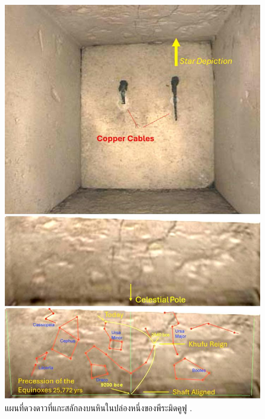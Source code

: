 \documentclass[10pt,twocolumn,letterpaper]{article}
\begin{document}
\begin{figure}[H]
\begin{center}
   \includegraphics[width=1\linewidth]{star-stone.jpg}
\end{center}
   \caption{แผนที่ดวงดาวที่แกะสลักลงบนหินในปล่องหนึ่งของพีระมิดคูฟู \cite{28}.}
\label{fig:20}
\label{fig:onecol}
\end{figure}
\end{document}
